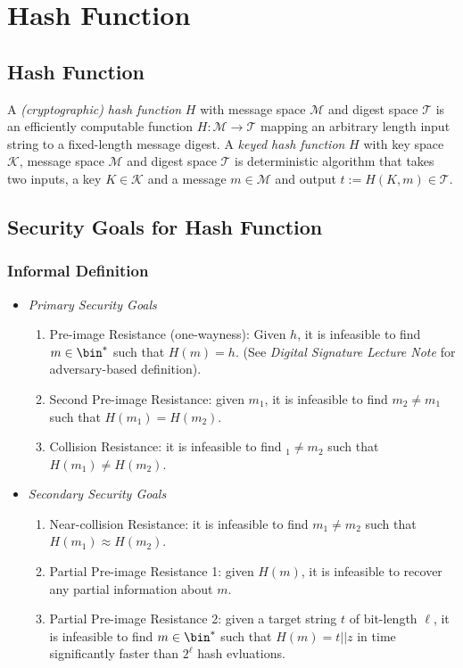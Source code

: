 \documentclass[11pt,a4paper]{article}
\begin{document}
\newpage
\section{Hash Function}
\subsection{Hash Function} A \textit{(cryptographic) hash function} $H$ with message space $\mathcal{M}$ and digest space $\mathcal{T}$ is an efficiently computable function $H: \mathcal{M} \rightarrow \mathcal{T}$ mapping an arbitrary length input string to a fixed-length message digest. A \textit{keyed hash function} $H$ with key space $\mathcal{K}$, message space $\mathcal{M}$ and digest space $\mathcal{T}$ is deterministic algorithm that takes two inputs, a key $K \in \mathcal{K}$ and a message $m \in \mathcal{M}$ and output $t := H(K,m) \in \mathcal{T}$.  



\subsection{Security Goals for Hash Function}
\subsubsection{Informal Definition}
\begin{itemize}
	\item \textit{Primary Security Goals}
	\begin{enumerate}
		\item Pre-image Resistance (one-wayness): Given $h$, it is infeasible to find $m \in \bin^*$ such that $H(m) = h$. (See \textit{Digital Signature Lecture Note} for adversary-based definition). 
		\item Second Pre-image Resistance: given $m_1$, it is infeasible to find $m_2 \neq m_1$ such that $H(m_1) = H(m_2)$. 
		\item Collision Resistance: it is infeasible to find $_1 \neq m_2$ such that $H(m_1) \neq H(m_2)$. 
	\end{enumerate}
	\item \textit{Secondary Security Goals}
	\begin{enumerate}
		\item Near-collision Resistance: it is infeasible to find $m_1 \neq m_2$ such that $H(m_1) \approx H(m_2)$. 
		\item Partial Pre-image Resistance 1: given $H(m)$, it is infeasible to recover any partial information about $m$. 
		\item Partial Pre-image Resistance 2: given a target string $t$ of bit-length $\ell$, it is infeasible to find $m \in \bin^*$ such that $H(m) = t || z$ in time significantly faster than $2^\ell$ hash evluations. 
	\end{enumerate}
\end{itemize}
\end{document}
